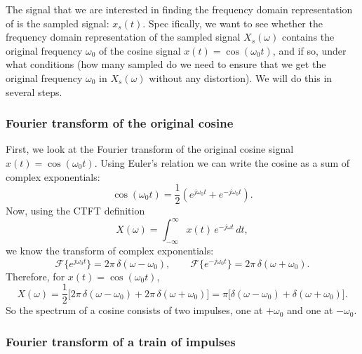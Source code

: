 The signal that we are interested in finding the frequency domain representation of is the sampled signal: $x_s(t)$. Spec ifically, we want to see whether the frequency domain representation of the sampled signal $X_s(\omega)$ contains the original frequency $\omega_0$ of the cosine signal $x(t) = \cos(\omega_0 t)$, and if so, under what conditions (how many sampled do we need to ensure that we get the original frequency $\omega_0$ in $X_s(\omega) $ without any distortion).
We will do this in several steps. 

\subsubsection{Fourier transform of the original cosine}
First, we look at the Fourier transform of the original cosine signal $x(t) = \cos(\omega_0 t)$. Using Euler's relation we can write the cosine as a sum of complex exponentials:
\[
\cos(\omega_0 t) = \frac{1}{2}\left(e^{j\omega_0 t} + e^{-j\omega_0 t}\right).
\]
Now, using the CTFT definition
\[
X(\omega) = \int_{-\infty}^{\infty} x(t)\,e^{-j\omega t}\,dt,
\]
we know the transform of complex exponentials:
\[
\mathcal{F}\{e^{j\omega_0 t}\} = 2\pi\,\delta(\omega - \omega_0),\qquad
\mathcal{F}\{e^{-j\omega_0 t}\} = 2\pi\,\delta(\omega + \omega_0).
\]
Therefore, for $x(t) = \cos(\omega_0 t)$,
\[
X(\omega)
= \frac{1}{2}\bigl[2\pi\,\delta(\omega-\omega_0) + 2\pi\,\delta(\omega+\omega_0)\bigr]
= \pi\bigl[\delta(\omega-\omega_0) + \delta(\omega+\omega_0)\bigr].
\]
So the spectrum of a cosine consists of two impulses, one at $+\omega_0$ and one at $-\omega_0$.

\subsubsection{Fourier transform of a train of impulses}

